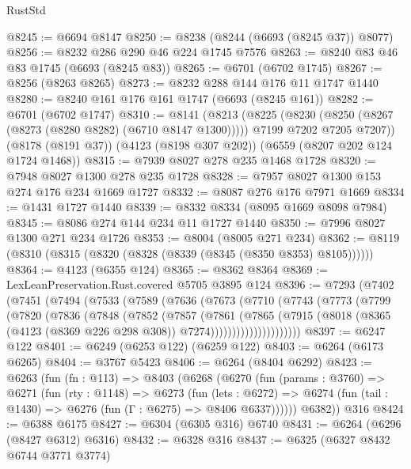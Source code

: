 \begin{lexlean}{RustStd}
\begin{coremodule}
@8245 := @6694 @8147
@8250 := @8238 (@8244 (@6693 (@8245 @37)) @8077)
@8256 := @8232 @286 @290 @46 @224 @1745 @7576
@8263 := @8240 @83 @46 @83 @1745 (@6693 (@8245 @83))
@8265 := @6701 (@6702 @1745)
@8267 := @8256 (@8263 @8265)
@8273 := @8232 @288 @144 @176 @11 @1747 @1440
@8280 := @8240 @161 @176 @161 @1747 (@6693 (@8245 @161))
@8282 := @6701 (@6702 @1747)
@8310 := @8141
    (@8213
      (@8225
        (@8230 (@8250 (@8267 (@8273 (@8280 @8282) (@6710 @8147 @1300)))))
        @7199
        @7202
        @7205
        @7207))
    (@8178 (@8191 @37))
    (@4123 (@8198 @307 @202))
    (@6559 (@8207 @202 @124 @1724 @1468))
@8315 := @7939 @8027 @278 @235 @1468 @1728
@8320 := @7948 @8027 @1300 @278 @235 @1728
@8328 := @7957 @8027 @1300 @153 @274 @176 @234 @1669 @1727
@8332 := @8087 @276 @176 @7971 @1669
@8334 := @1431 @1727 @1440
@8339 := @8332 @8334 (@8095 @1669 @8098 @7984)
@8345 := @8086 @274 @144 @234 @11 @1727 @1440
@8350 := @7996 @8027 @1300 @271 @234 @1726
@8353 := @8004 (@8005 @271 @234)
@8362 := @8119 (@8310 (@8315 (@8320 (@8328 (@8339 (@8345 (@8350 @8353) @8105))))))
@8364 := @4123 (@6355 @124)
@8365 := @8362 @8364
@8369 := LexLeanPreservation.Rust.covered @5705 @3895 @124
@8396 := @7293
    (@7402
      (@7451
        (@7494
          (@7533
            (@7589
              (@7636
                (@7673
                  (@7710
                    (@7743
                      (@7773
                        (@7799
                          (@7820
                            (@7836
                              (@7848
                                (@7852
                                  (@7857
                                    (@7861
                                      (@7865
                                        (@7915
                                          (@8018
                                            (@8365
                                              (@4123 (@8369 @226 @298 @308))
                                              @7274)))))))))))))))))))))
@8397 := @6247 @122
@8401 := @6249 (@6253 @122) (@6259 @122)
@8403 := @6264 (@6173 @6265)
@8404 := @3767 @5423
@8406 := @6264 (@8404 @6292)
@8423 := @6263
    (fun (fn : @113) =>
    @8403
      (@6268
        (@6270
          (fun (params : @3760) =>
          @6271
            (fun (rty : @1148) =>
            @6273
              (fun (lets : @6272) =>
              @6274 (fun (tail : @1430) => @6276 (fun (Γ : @6275) => @8406 @6337))))))
        @6382))
    @316
@8424 := @6388 @6175
@8427 := @6304 (@6305 @316) @6740
@8431 := @6264 (@6296 (@8427 @6312) @6316)
@8432 := @6328 @316
@8437 := @6325 (@6327 @8432 @6744 @3771 @3774)

\end{coremodule}
\end{lexlean}
